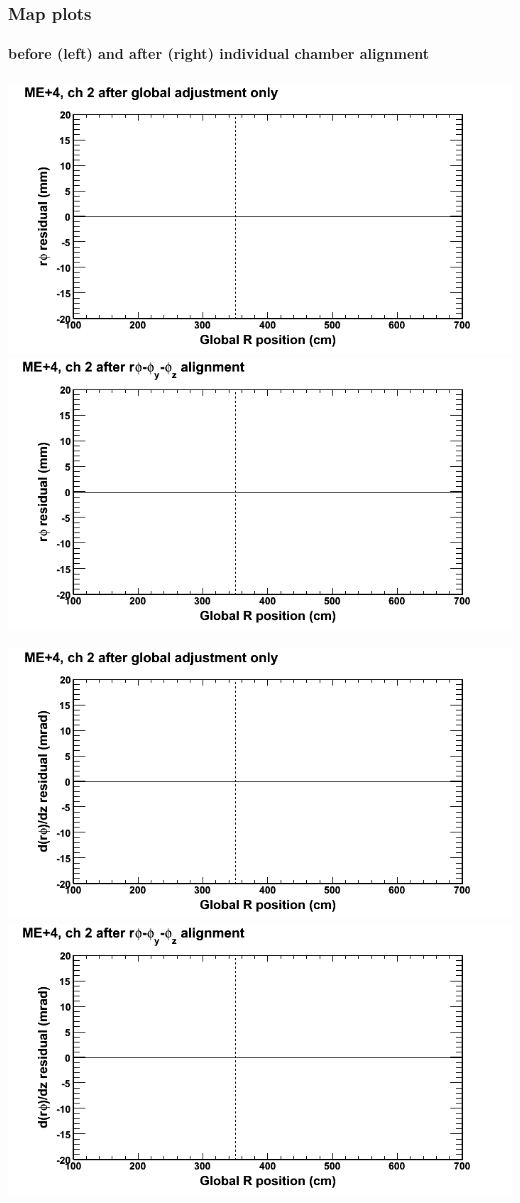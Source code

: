\documentclass[compress]{beamer}
\begin{document}
\begin{frame}
\frametitle{Map plots}
\framesubtitle{before (left) and after (right) individual chamber alignment}
\includegraphics[width=0.5\linewidth]{ringmapplots_3dof/before_CSCvsr_mep4ch02_x.png} \includegraphics[width=0.5\linewidth]{ringmapplots_3dof/after_CSCvsr_mep4ch02_x.png}

\includegraphics[width=0.5\linewidth]{ringmapplots_3dof/before_CSCvsr_mep4ch02_dxdz.png} \includegraphics[width=0.5\linewidth]{ringmapplots_3dof/after_CSCvsr_mep4ch02_dxdz.png}
\end{frame}
\end{document}
